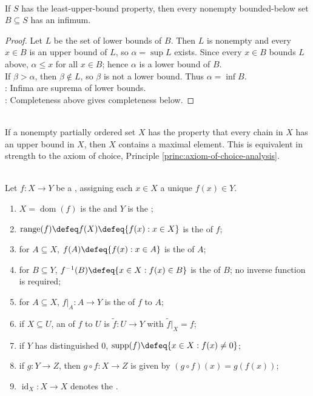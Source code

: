 \begin{theorem} \label{thm:lub-property-gives-glb-property} \\
If $S$ has the least-upper-bound property, then every nonempty bounded-below set $B\subseteq S$ has an infimum.
\begin{proof}
Let $L$ be the set of lower bounds of $B$. Then $L$ is nonempty and every $x\in B$ is an upper bound of $L$, so $\alpha=\sup L$ exists. Since every $x\in B$ bounds $L$ above, $\alpha\leq x$ for all $x\in B$; hence $\alpha$ is a lower bound of $B$.\\
If $\beta>\alpha$, then $\beta\notin L$, so $\beta$ is not a lower bound. Thus $\alpha=\inf B$.\\
: Infima are suprema of lower bounds.\\
: Completeness above gives completeness below.
\end{proof}
\end{theorem}

\begin{principle} \label{princ:zorns-lemma} \\
If a nonempty partially ordered set $X$ has the property that every chain in $X$ has an upper bound in $X$, then $X$ contains a maximal element. This is equivalent in strength to the axiom of choice, Principle \ref{princ:axiom-of-choice-analysis}.
\end{principle}

\begin{definition} \label{def:functions-images-preimages} \\
Let $f:X\to Y$ be a , assigning each $x\in X$ a unique $f(x)\in Y$.
\begin{enumerate}[label=(\roman*)]
\setlength{\itemsep}{0pt}
\item $X=\operatorname{dom}(f)$ is the  and $Y$ is the ;
\item $\operatorname{range}(f)\defeq f(X)\defeq\{f(x):x\in X\}$ is the  of $f$;
\item for $A\subseteq X$, $f(A)\defeq\{f(x):x\in A\}$ is the  of $A$;
\item for $B\subseteq Y$, $f^{-1}(B)\defeq\{x\in X:f(x)\in B\}$ is the  of $B$; no inverse function is required;
\item for $A\subseteq X$, $f|_A:A\to Y$ is the  of $f$ to $A$;
\item if $X\subseteq U$, an  of $f$ to $U$ is $\widetilde f:U\to Y$ with $\widetilde f|_X=f$;
\item if $Y$ has distinguished $0$, $\operatorname{supp}(f)\defeq\{x\in X:f(x)\neq0\}$;
\item if $g:Y\to Z$, then $g\circ f:X\to Z$ is given by $(g\circ f)(x)=g(f(x))$;
\item $\operatorname{id}_X:X\to X$ denotes the .
\end{enumerate}
\end{definition}

